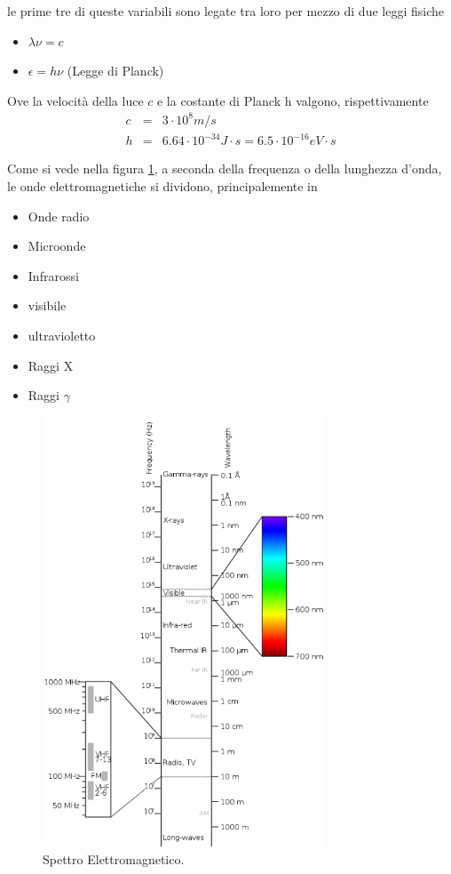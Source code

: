 \documentclass[17pt]{extarticle}
\begin{document}
le prime tre di queste variabili sono legate tra loro per mezzo di due leggi fisiche

\begin{itemize}
	\item $\lambda\nu = c$
	\item $\epsilon = h\nu$ (Legge di Planck)
\end{itemize}

Ove la velocità della luce $c$ e la costante di Planck h valgono, rispettivamente
\begin{eqnarray}
	c & = & 3\cdot 10^8m/s\\
	h & = & 6.64\cdot 10^{-34}J\cdot s = 6.5\cdot 10^{-16} eV\cdot s
\end{eqnarray}


Come si vede nella figura \ref{fig:spettroElettromagnetico}, a seconda della frequenza o della lunghezza d'onda, le onde elettromagnetiche si dividono, principalemente in 

\begin{itemize}
	\item Onde radio
	\item Microonde
	\item Infrarossi
	\item visibile
	\item ultravioletto
	\item Raggi X
	\item Raggi $\gamma$
\end{itemize}

\begin{figure}[b!]		%
	\centering
   	\includegraphics[width=3.3in]{spettroElettromagnetico.png}%
  	\caption{Spettro Elettromagnetico.}
   	\label{fig:spettroElettromagnetico}%
\end{figure}
\end{document}
